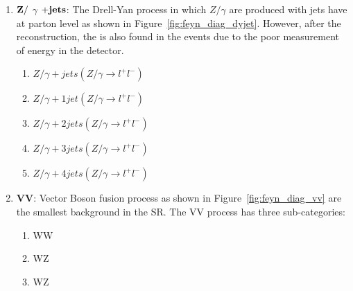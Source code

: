 \begin{enumerate}
   \item ${\bf{Z/}}$ $\gamma$ ${\bf{+ jets}}$: The Drell-Yan process in which $Z/\gamma$
       are produced with jets have \ljets at parton level as shown in
       Figure~\ref{fig:feyn_diag_dyjet}.
       However, after the reconstruction, the \MET is also found in the events due to the poor
       measurement of energy in the detector.
   \begin{enumerate}
     \item $Z/\gamma + jets   (Z/\gamma \rightarrow l^+ l^-)$
     \item $Z/\gamma + 1 jet  (Z/\gamma \rightarrow l^+ l^-)$
     \item $Z/\gamma + 2 jets (Z/\gamma \rightarrow l^+ l^-)$
     \item $Z/\gamma + 3 jets (Z/\gamma \rightarrow l^+ l^-)$
     \item $Z/\gamma + 4 jets (Z/\gamma \rightarrow l^+ l^-)$
   \end{enumerate}
 
   \item {\bf{VV}}: Vector Boson fusion process as shown in Figure~\ref{fig:feyn_diag_vv}
       are the smallest background in the SR. The VV process has three sub-categories:
   \begin{enumerate}
     \item WW
     \item WZ
     \item WZ
   \end{enumerate}
 \end{enumerate}
